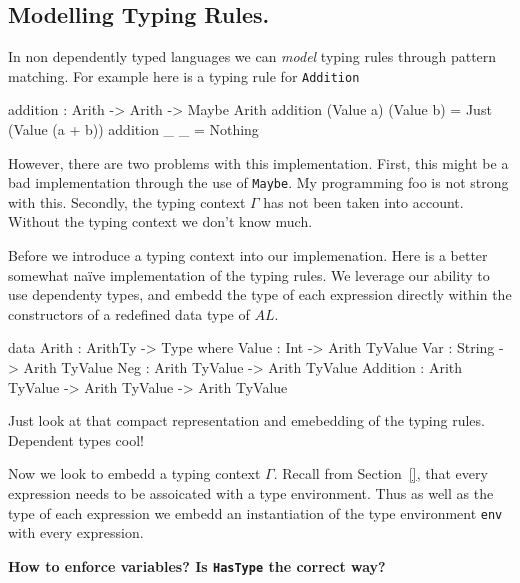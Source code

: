 \subsection{Modelling Typing Rules.}
\label{sec:rules:modelling}

In non dependently typed languages we can \emph{model} typing rules through pattern matching.
For example here is a typing rule for \texttt{Addition}
\begin{code}
addition : Arith -> Arith -> Maybe Arith
addition (Value a) (Value b) = Just (Value (a + b))
addition _         _         = Nothing
\end{code}

\noindent
However, there are two problems with this implementation.
First, this might be a bad implementation through the use of \texttt{Maybe}.
My programming foo is not strong with this.
Secondly, the typing context $\Gamma$ has not been taken into account.
Without the typing context we don't know much.

Before we introduce a typing context into our implemenation.
Here is a better somewhat na\"{i}ve implementation of the typing rules.
We leverage our ability to use dependenty types, and embedd the type of each expression directly within the constructors of a redefined data type of $AL$.

\begin{code}
data Arith : ArithTy -> Type where
  Value    : Int                            -> Arith TyValue
  Var      : String                         -> Arith TyValue
  Neg      : Arith TyValue                  -> Arith TyValue
  Addition : Arith TyValue -> Arith TyValue -> Arith TyValue
\end{code}

\noindent
Just look at that compact representation and emebedding of the typing rules.
Dependent types cool!

Now we look to embedd a typing context $\Gamma$.
Recall from Section~\ref{}, that every expression needs to be assoicated with a type environment.
Thus as well as the type of each expression we embedd an instantiation of the type environment \texttt{env} with every expression.

\begin{center}
  \bfseries How to enforce variables? Is \texttt{HasType} the correct way?
\end{center}

